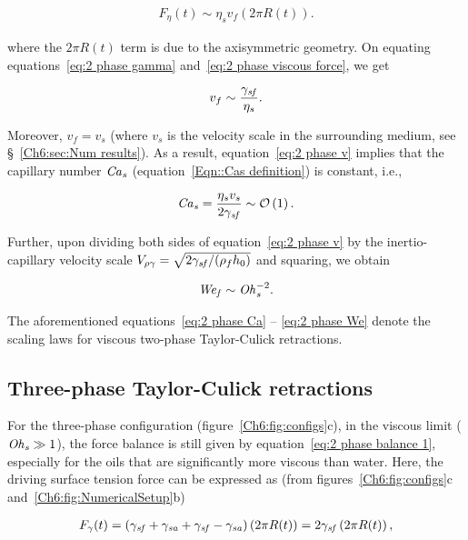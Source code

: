 \begin{align}
	F_{\eta}(t) \sim \eta_{s} v_f\left(2\pi R(t)\right).
	\label{eq:2 phase viscous force}
\end{align}

\noindent where the $2\pi R(t)$ term is due to the axisymmetric geometry. On equating equations~\eqref{eq:2 phase gamma} and~\eqref{eq:2 phase viscous force}, we get

\begin{align}
	v_f \sim \frac{\gamma_\mathit{sf}}{\eta_{s}} .
	\label{eq:2 phase v}
\end{align}

Moreover, $v_f = v_s$ (where $v_s$ is the velocity scale in the surrounding medium, see \S~\ref{Ch6:sec:Num results}). As a result, equation~\eqref{eq:2 phase v} implies that the capillary number $\mathit{Ca}_\mathit{s}$ (equation~\eqref{Eqn::Cas definition}) is constant, i.e.,

\begin{align}
	\mathit{Ca}_\mathit{s} = \frac{\eta_s v_s}{2\gamma_\mathit{sf}} \sim \mathcal{O}\left(1\right) .
	\label{eq:2 phase Ca}
\end{align}

Further, upon dividing both sides of equation~\eqref{eq:2 phase v} by the inertio-capillary velocity scale $V_{\rho\gamma} = \sqrt{2\gamma_\mathit{sf}/(\rho_fh_0)}$ and squaring, we obtain

\begin{align}
	\mathit{We}_\mathit{f} \sim \mathit{Oh}_\mathit{s}^{-2} .
	\label{eq:2 phase We}
\end{align}

\noindent The aforementioned equations~\eqref{eq:2 phase Ca} -- \eqref{eq:2 phase We} denote the scaling laws for viscous two-phase Taylor-Culick retractions. 

\subsection{Three-phase Taylor-Culick retractions}\label{sec:3-phase forces}
For the three-phase configuration (figure~\ref{Ch6:fig:configs}c), in the viscous limit ($\mathit{Oh}_\mathit{s} \gg 1$), the force balance is still given by equation~\eqref{eq:2 phase balance 1}, especially for the oils that are significantly more viscous than water. Here, the driving surface tension force can be expressed as (from figures~\ref{Ch6:fig:configs}c and~\ref{Ch6:fig:NumericalSetup}b)

\begin{align}
	F_\gamma(t) = (\gamma_\mathit{sf} + \gamma_\mathit{sa} + \gamma_\mathit{sf} - \gamma_\mathit{sa}) \left(2\pi R(t)\right)= 2 \gamma_\mathit{sf}\left(2\pi R(t)\right),
	\label{eq:3 phase gamma}
\end{align}

